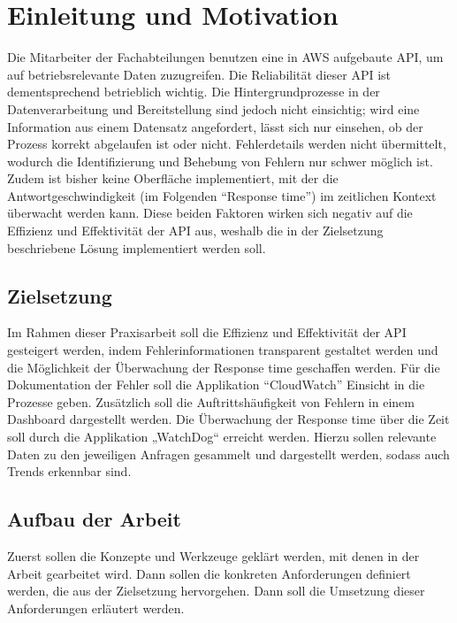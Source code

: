 \section{Einleitung und Motivation}
Die Mitarbeiter der Fachabteilungen benutzen eine in AWS aufgebaute API, um auf betriebsrelevante Daten zuzugreifen. Die Reliabilität dieser API ist dementsprechend betrieblich wichtig. Die Hintergrundprozesse in der Datenverarbeitung und Bereitstellung sind jedoch nicht einsichtig; wird eine Information aus einem Datensatz angefordert, lässt sich nur einsehen, ob der Prozess korrekt abgelaufen ist oder nicht. Fehlerdetails werden nicht übermittelt, wodurch die Identifizierung und Behebung von Fehlern nur schwer möglich ist. Zudem ist bisher keine Oberfläche implementiert, mit der die Antwortgeschwindigkeit (im Folgenden ``Response time'') im zeitlichen Kontext überwacht werden kann. Diese beiden Faktoren wirken sich negativ auf die Effizienz und Effektivität der API aus, weshalb die in der Zielsetzung beschriebene Lösung implementiert werden soll.
\subsection{Zielsetzung}
Im Rahmen dieser Praxisarbeit soll die Effizienz  und Effektivität der API gesteigert werden, indem Fehlerinformationen transparent gestaltet werden und die Möglichkeit der Überwachung der Response time geschaffen werden. Für die Dokumentation der Fehler soll die Applikation ``CloudWatch'' Einsicht in die Prozesse geben. Zusätzlich soll die Auftrittshäufigkeit von Fehlern in einem Dashboard dargestellt werden. Die Überwachung der Response time über die Zeit soll durch die Applikation „WatchDog“ erreicht werden. Hierzu sollen relevante Daten zu den jeweiligen Anfragen gesammelt und dargestellt werden, sodass auch Trends erkennbar sind. 
\subsection{Aufbau der Arbeit}
Zuerst sollen die Konzepte und Werkzeuge geklärt werden, mit denen in der Arbeit gearbeitet wird. Dann sollen die konkreten Anforderungen definiert werden, die aus der Zielsetzung hervorgehen. Dann soll die Umsetzung dieser Anforderungen erläutert werden.  
